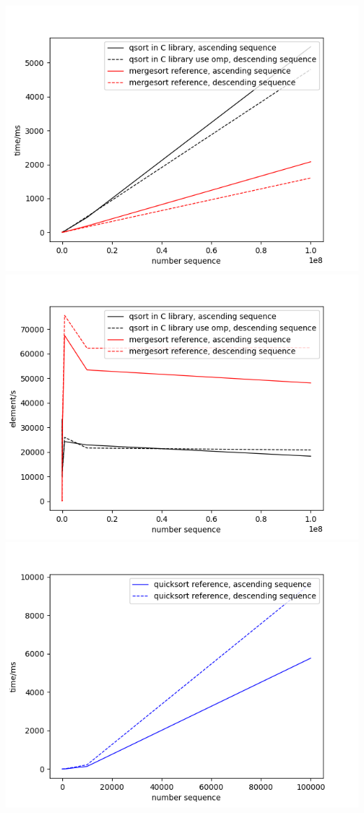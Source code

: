 \documentclass[12pt]{article}
\begin{document}
\includegraphics[scale=0.5]{3s}
\includegraphics[scale=0.5]{3m}
\includegraphics[scale=0.5]{3s1}
\end{document}
